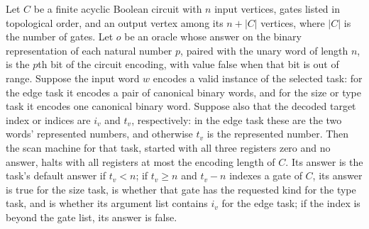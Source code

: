 \begin{theorem}
\label{BoolCircuit.AdjScan.scan_halts}
\leanok
{}
Let $C$ be a finite acyclic Boolean circuit with $n$ input vertices, gates listed in
topological order, and an output vertex among its $n+|C|$ vertices, where $|C|$ is the
number of gates. Let $o$ be an oracle whose answer on the binary representation of each
natural number $p$, paired with the unary word of length $n$, is the $p$th bit of the
circuit encoding, with value false when that bit is out of range. Suppose the input word
$w$ encodes a valid instance of the selected task: for the edge task it encodes a pair
of canonical binary words, and for the size or type task it encodes one canonical binary
word. Suppose also that the decoded target index or indices are $i_v$ and $t_v$,
respectively: in the edge task these are the two words’ represented numbers, and
otherwise $t_v$ is the represented number. Then the scan machine for that task, started
with all three registers zero and no answer, halts with all registers at most the
encoding length of $C$. Its answer is the task’s default answer if $t_v<n$; if $t_v\ge
n$ and $t_v-n$ indexes a gate of $C$, its answer is true for the size task, is whether
that gate has the requested kind for the type task, and is whether its argument list
contains $i_v$ for the edge task; if the index is beyond the gate list, its answer is
false.
\end{theorem}
